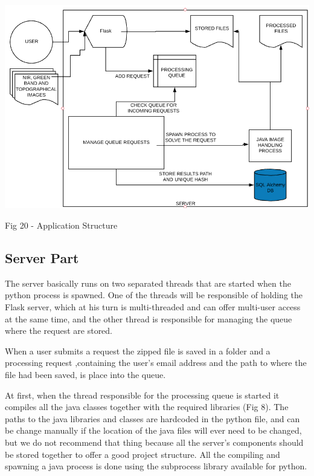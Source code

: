 \documentclass[12pt, a4paper]{report}
\begin{document}
\medskip
\includegraphics[scale=0.795, right]{application_overview.png}
\begin{center}
Fig 20 - Application Structure 
\end{center}
\par 

\subsection{Server Part}

\quad 
The server basically runs on two separated threads that are started when the python process is spawned. One of the threads will be responsible of holding the Flask server, which at his turn is multi-threaded and can offer multi-user access at the same time, and the other thread is responsible for managing the queue where the request are stored.
\par 

When a user submits a request the zipped file is saved in a folder  and a processing request ,containing the user's email address and the path to where the file had been saved, is place into the queue. 
\par 

At first, when the thread responsible for the processing queue is started it compiles all the java classes together with the required libraries (Fig 8). The paths to the java libraries and classes are hardcoded in the python file, and can be change manually if the location of the java files will ever need to be changed, but we do not recommend that thing because all the server's components should be stored together to offer a good project structure. All the compiling and spawning a java process is done using the subprocess library available for python. 
\par 
\end{document}
